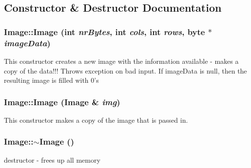\subsection{Constructor \& Destructor Documentation}
\hypertarget{classCartWheel_1_1Util_1_1Image_aaec45fba96236c8c7509e48d786ad653}{
\subsubsection[{Image}]{\setlength{\rightskip}{0pt plus 5cm}Image::Image (int {\em nrBytes}, \/  int {\em cols}, \/  int {\em rows}, \/  byte $\ast$ {\em imageData})}}
\label{classCartWheel_1_1Util_1_1Image_aaec45fba96236c8c7509e48d786ad653}
This constructor creates a new image with the information available -\/ makes a copy of the data!!! Throws exception on bad input. If imageData is null, then the resulting image is filled with 0's \hypertarget{classCartWheel_1_1Util_1_1Image_ad9a2ebd07a4f458ba24d91af0122418e}{
\subsubsection[{Image}]{\setlength{\rightskip}{0pt plus 5cm}Image::Image ({\bf Image} \& {\em img})}}
\label{classCartWheel_1_1Util_1_1Image_ad9a2ebd07a4f458ba24d91af0122418e}
This constructor makes a copy of the image that is passed in. \hypertarget{classCartWheel_1_1Util_1_1Image_a0294f63700543e11c0f0da85601c7ae5}{
\subsubsection[{$\sim$Image}]{\setlength{\rightskip}{0pt plus 5cm}Image::$\sim$Image ()}}
\label{classCartWheel_1_1Util_1_1Image_a0294f63700543e11c0f0da85601c7ae5}
destructor -\/ frees up all memory 

